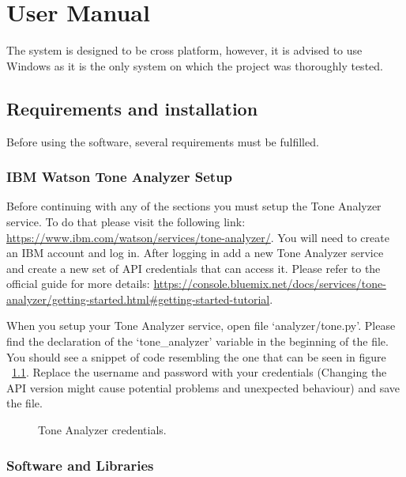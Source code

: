 \chapter{User Manual \label{chap:usermanual}}
The system is designed to be cross platform, however, it is advised to use Windows as it is the only system on which the project was thoroughly tested.

\section{Requirements and installation \label{sec:requirements}}
Before using the software, several requirements must be fulfilled.

\subsection{IBM Watson Tone Analyzer Setup}
Before continuing with any of the sections you must setup the Tone Analyzer service. To do that please visit the following link: \url{https://www.ibm.com/watson/services/tone-analyzer/}. You will need to create an IBM account and log in. After logging in add a new Tone Analyzer service and create a new set of API credentials that can access it. Please refer to the official guide for more details: \url{https://console.bluemix.net/docs/services/tone-analyzer/getting-started.html#getting-started-tutorial}.

When you setup your Tone Analyzer service, open file `analyzer/tone.py'. Please find the declaration of the `tone\_analyzer' variable in the beginning of the file. You should see a snippet of code resembling the one that can be seen in figure ~\ref{fig:credentials}. Replace the username and password with your credentials (Changing the API version might cause potential problems and unexpected behaviour) and save the file.

\begin{figure}[H]
	\centerline{}
	\caption{Tone Analyzer credentials.}\label{fig:credentials}
\end{figure}


\subsection{Software and Libraries}
